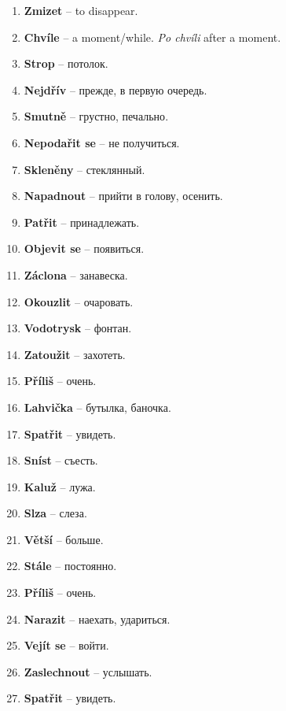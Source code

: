 \documentclass[12pt]{book}
\begin{document}
\begin{enumerate}
    \item \textbf{Zmizet} -- to disappear.
    \item \textbf{Chvíle} -- a moment/while. \emph{Po chvíli} after a moment.
    \item \textbf{Strop} -- \textrussian{потолок}.
    \item \textbf{Nejdřív} -- \textrussian{прежде, в первую очередь}.
    \item \textbf{Smutně} -- \textrussian{грустно, печально}.
    \item \textbf{Nepodařit se} -- \textrussian{не получиться}.
    \item \textbf{Skleněny} -- \textrussian{стеклянный}.
    \item \textbf{Napadnout} -- \textrussian{прийти в голову, осенить}.
    \item \textbf{Patřit} -- \textrussian{принадлежать}.
    \item \textbf{Objevit se} -- \textrussian{появиться}.
    \item \textbf{Záclona} -- \textrussian{занавеска}.
    \item \textbf{Okouzlit} -- \textrussian{очаровать}.
    \item \textbf{Vodotrysk} -- \textrussian{фонтан}.
    \item \textbf{Zatoužit} -- \textrussian{захотеть}.
    \item \textbf{Příliš} -- \textrussian{очень}.
    \item \textbf{Lahvička} -- \textrussian{бутылка, баночка}.
    \item \textbf{Spatřit} -- \textrussian{увидеть}.
    \item \textbf{Sníst} -- \textrussian{съесть}.
    \item \textbf{Kaluž} -- \textrussian{лужа}.
    \item \textbf{Slza} -- \textrussian{слеза}.
    \item \textbf{Větší} -- \textrussian{больше}.
    \item \textbf{Stále} -- \textrussian{постоянно}.
    \item \textbf{Příliš} -- \textrussian{очень}.
    \item \textbf{Narazit} -- \textrussian{наехать, удариться}.
    \item \textbf{Vejít se} -- \textrussian{войти}.
    \item \textbf{Zaslechnout} -- \textrussian{услышать}.
    \item \textbf{Spatřit} -- \textrussian{увидеть}.

\end{enumerate}
\end{document}
